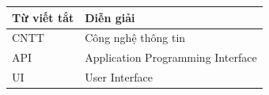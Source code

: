 \documentclass[../main.tex]{subfiles}
\begin{document}
\begin{table}[H]
\centering
\renewcommand{\arraystretch}{1.3}
\begin{tabular}{|p{4cm}|p{9cm}|}
\hline
\textbf{Từ viết tắt} & \textbf{Diễn giải} \\
\hline
CNTT & Công nghệ thông tin \\
\hline
API & Application Programming Interface \\
\hline
UI & User Interface \\
\hline
\end{tabular}
\end{table}
\end{document}
